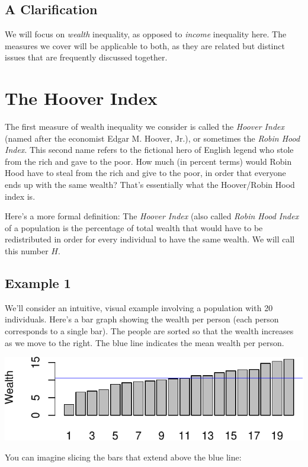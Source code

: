 \documentclass[12pt]{memoir}\usepackage[]{graphicx}\usepackage[table]{xcolor}
\begin{document}
\subsection*{A Clarification}

We will focus on \emph{wealth} inequality, as opposed to \emph{income} inequality
here.  The measures we cover will be applicable to both, as they are related 
but distinct issues that are frequently discussed together.

\section*{The Hoover Index}

The first measure of wealth inequality we consider is called the \emph{Hoover Index} (named after the economist
Edgar M. Hoover, Jr.), or sometimes the \emph{Robin Hood Index}.  This second name refers to the fictional hero of English legend who stole from the rich and gave to the poor.  How much (in percent terms) would Robin Hood have
to steal from the rich and give to the poor, in order that everyone ends up with the same wealth?
That's essentially what the Hoover/Robin Hood index is.  

Here's a more formal definition:  The \emph{Hoover Index} (also called \emph{Robin Hood Index} of a population is the percentage of total wealth that would have to be redistributed in order for every individual to have the same wealth.  We will call this number $H$.

\subsection*{Example 1}
We'll consider an intuitive, visual example involving a population with 20 individuals.
Here's a bar graph showing the wealth per person (each person corresponds to a single bar).
The people are sorted so that the wealth increases as we move to the right.  The blue
line indicates the mean wealth per person.


\begin{center}
\includegraphics{figure/bar2-1.pdf}
\end{center}
You can imagine slicing the bars that extend above the blue line:
\end{document}
